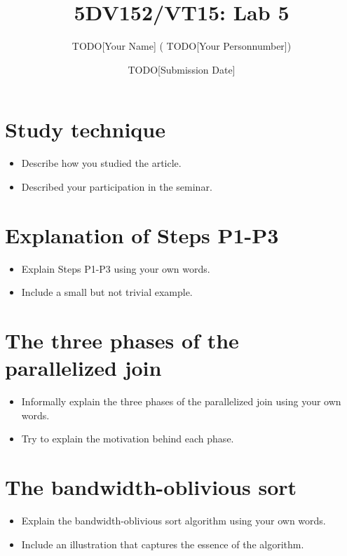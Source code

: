 \documentclass[a4paper,12pt]{article}
\newcommand{\todo}[1]{{\color{blue} TODO[#1]}}
\begin{document}
\title{5DV152/VT15: Lab 5}
\author{\todo{Your Name} (\todo{Your Personnumber})}
\date{\todo{Submission Date}}
\maketitle


\section{Study technique}

\begin{itemize}
\item Describe how you studied the article.
\item Described your participation in the seminar.
\end{itemize}

\section{Explanation of Steps P1-P3}

\begin{itemize}
\item Explain Steps P1-P3 using your own words.
\item Include a small but not trivial example.
\end{itemize}

\section{The three phases of the parallelized join}

\begin{itemize}
\item Informally explain the three phases of the parallelized join using your own words.
\item Try to explain the motivation behind each phase.
\end{itemize}

\section{The bandwidth-oblivious sort}

\begin{itemize}
\item Explain the bandwidth-oblivious sort algorithm using your own words.
\item Include an illustration that captures the essence of the algorithm.
\end{itemize}
\end{document}
